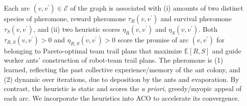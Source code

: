 \documentclass[fleqn,10pt,lineno]{wlpeerj}
\begin{document}
Each arc $(v, v^\prime)\in\mathcal{E}$ of the graph is associated with 
(i) amounts of two distinct species of pheromone, reward pheromone $\tau_R(v, v^\prime)$ and survival pheromone $\tau_S(v, v^\prime)$, and 
(ii) two heuristic scores $\eta_R(v, v^\prime)$ and $\eta_S(v, v^\prime)$.
Both $\tau_{R, S}(v, v^\prime)>0$ and $\eta_{R, S}(v, v^\prime)>0$ score the promise of arc $(v, v^\prime)$ for belonging to Pareto-optimal team trail plans that maximize $\mathbb{E}[R, S]$ and guide worker ants' construction of robot-team trail plans.
The pheromone is (1) learned, reflecting the past collective experience/memory of the ant colony, and (2) dynamic over iterations, due to deposition by the ants and evaporation.
By contrast, the heuristic is static and scores the \emph{a priori}, greedy/myopic appeal of each arc.
We incorporate the heuristics into ACO to accelerate its convergence.
%
%
%
\end{document}
